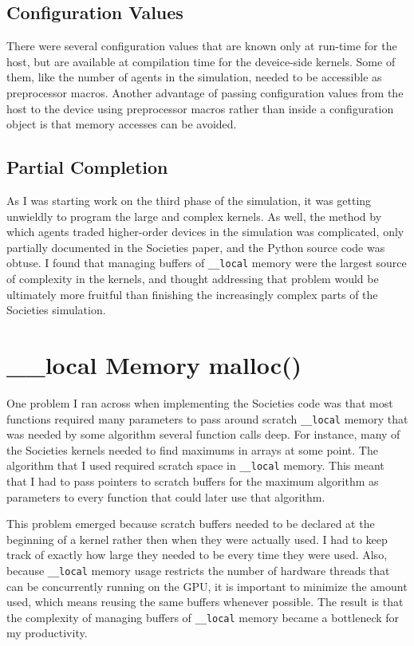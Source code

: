 \documentclass{article}
\begin{document}
\subsection{Configuration Values}
There were several configuration values that are known only at run-time for the host, but are available at compilation time for the deveice-side kernels. Some of them, like the number of agents in the simulation, needed to be accessible as preprocessor macros. Another advantage of passing configuration values from the host to the device using preprocessor macros rather than inside a configuration object is that memory accesses can be avoided.

\subsection{Partial Completion}
As I was starting work on the third phase of the simulation, it was getting unwieldly to program the large and complex kernels. As well, the method by which agents traded higher-order devices in the simulation was complicated, only partially documented in the Societies paper, and the Python source code was obtuse. I found that managing buffers of \texttt{\_\_local} memory were the largest source of complexity in the kernels, and thought addressing that problem would be ultimately more fruitful than finishing the increasingly complex parts of the Societies simulation.

\section{\_\_local Memory malloc()}
One problem I ran across when implementing the Societies code was that most functions required many parameters to pass around scratch \texttt{\_\_local} memory that was needed by some algorithm several function calls deep. For instance, many of the Societies kernels needed to find maximums in arrays at some point. The algorithm that I used required scratch space in \texttt{\_\_local} memory. This meant that I had to pass pointers to scratch buffers for the maximum algorithm as parameters to every function that could later use that algorithm.

This problem emerged because scratch buffers needed to be declared at the beginning of a kernel rather then when they were actually used. I had to keep track of exactly how large they needed to be every time they were used. Also, because \texttt{\_\_local} memory usage restricts the number of hardware threads that can be concurrently running on the GPU, it is important to minimize the amount used, which means reusing the same buffers whenever possible. The result is that the complexity of managing buffers of \texttt{\_\_local} memory became a bottleneck for my productivity.
\end{document}
